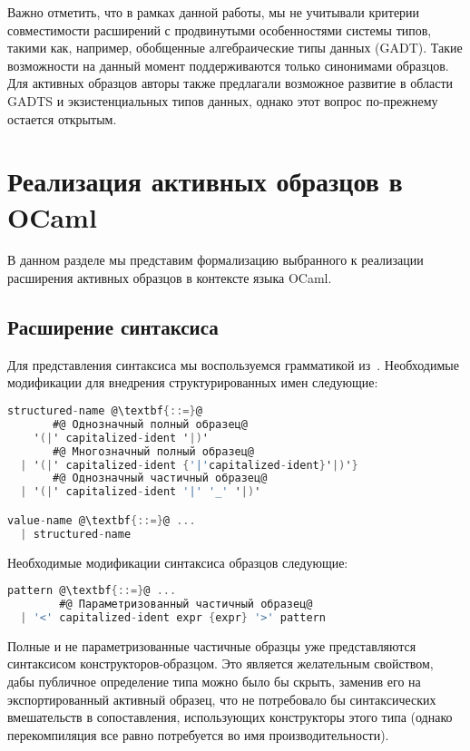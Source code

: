 Важно отметить, что в рамках данной работы, мы не учитывали критерии совместимости расширений с продвинутыми особенностями системы типов, такими как, например, обобщенные алгебраические типы данных (GADT). Такие возможности на данный момент поддерживаются только синонимами образцов. Для активных образцов авторы также предлагали возможное развитие в области GADTS и экзистенциальных типов данных, однако этот вопрос по-прежнему остается открытым. 

\section{Реализация активных образцов в OCaml}

В данном разделе мы представим формализацию выбранного к реализации расширения активных образцов в контексте языка OCaml.

\subsection{Расширение синтаксиса}

Для представления синтаксиса мы воспользуемся грамматикой из~\cite{leroy2019manual}. Необходимые модификации для внедрения структурированных имен следующие:

\noindent
\begin{minipage}{\linewidth}
\begin{lstlisting}[language=C,escapechar=@] 
structured-name @\textbf{::=}@
       #@ Однозначный полный образец@
    '(|' capitalized-ident '|)'
       #@ Многозначный полный образец@
  | '(|' capitalized-ident {'|'capitalized-ident}'|)'}
       #@ Однозначный частичный образец@
  | '(|' capitalized-ident '|' '_' '|)'

value-name @\textbf{::=}@ ... 
  | structured-name 
\end{lstlisting}
\end{minipage}

Необходимые модификации синтаксиса образцов следующие:

\noindent
\begin{minipage}{\linewidth}
\begin{lstlisting}[language=C,escapechar=@] 
pattern @\textbf{::=}@ ...
        #@ Параметризованный частичный образец@
  | '<' capitalized-ident expr {expr} '>' pattern
\end{lstlisting}
\end{minipage}

Полные и не параметризованные частичные образцы уже представляются синтаксисом конструкторов-образцом. Это является желательным свойством, дабы публичное определение типа можно было бы скрыть, заменив его на экспортированный активный образец, что не потребовало бы  синтаксических вмешательств в сопоставления, использующих конструкторы этого типа (однако перекомпиляция все равно потребуется во имя производительности).

